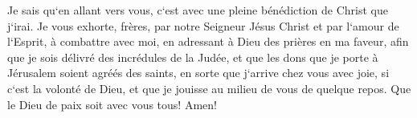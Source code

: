 \verse Je sais qu`en allant vers vous, c`est avec une pleine bénédiction de Christ que j`irai. 
\verse Je vous exhorte, frères, par notre Seigneur Jésus Christ et par l`amour de l`Esprit, à combattre avec moi, en adressant à Dieu des prières en ma faveur, 
\verse afin que je sois délivré des incrédules de la Judée, et que les dons que je porte à Jérusalem soient agréés des saints, 
\verse en sorte que j`arrive chez vous avec joie, si c`est la volonté de Dieu, et que je jouisse au milieu de vous de quelque repos. 
\verse Que le Dieu de paix soit avec vous tous! Amen! 

